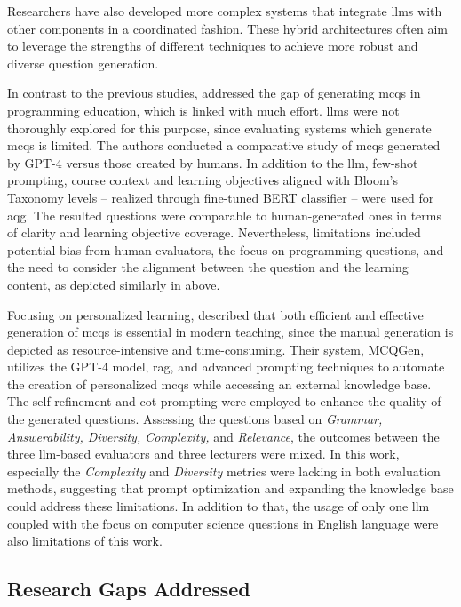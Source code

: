  Researchers have also developed more complex systems that integrate \acp{llm} with other components in a coordinated fashion. These hybrid architectures often aim to leverage the strengths of different techniques to achieve more robust and diverse question generation.

In contrast to the previous studies, \cite{doughty_comparative_2024} addressed the gap of generating \acp{mcq} in programming education, which is linked with much effort. \acp{llm} were not thoroughly explored for this purpose, since evaluating systems which generate \acp{mcq} is limited. The authors conducted a comparative study of \acp{mcq} generated by GPT-4 versus those created by humans. In addition to the \ac{llm}, few-shot prompting, course context and learning objectives aligned with Bloom's Taxonomy levels -- realized through fine-tuned BERT classifier -- were used for \ac{aqg}. The resulted questions were comparable to human-generated ones in terms of clarity and learning objective coverage. Nevertheless, limitations included potential bias from human evaluators, the focus on programming questions, and the need to consider the alignment between the question and the learning content, as depicted similarly in \cite{al_faraby_analysis_2024} above.

Focusing on personalized learning, \cite{hang_mcqgen_2024} described that both efficient and effective generation of \acp{mcq} is essential in modern teaching, since the manual generation is depicted as resource-intensive and time-consuming. Their system, MCQGen, utilizes the GPT-4 model, \ac{rag}, and advanced prompting techniques to automate the creation of personalized \acp{mcq} while accessing an external knowledge base. The self-refinement and \ac{cot} prompting were employed to enhance the quality of the generated questions. Assessing the questions based on \textit{Grammar, Answerability, Diversity, Complexity,} and \textit{Relevance}, the outcomes between the three \ac{llm}-based evaluators and three lecturers were mixed. In this work, especially the \textit{Complexity} and \textit{Diversity} metrics were lacking in both evaluation methods, suggesting that prompt optimization and expanding the knowledge base could address these limitations. In addition to that, the usage of only one \ac{llm} coupled with the focus on computer science questions in English language were also limitations of this work.

\subsection{Research Gaps Addressed}

